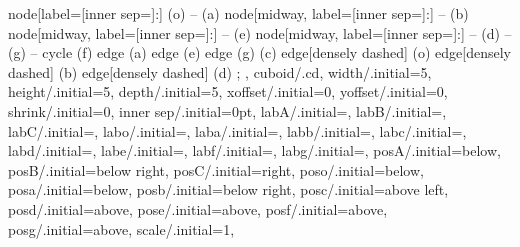 {{{        node[label={[inner sep=]:}] {}
         (o) 
         -- (a) 
         node[midway, label={[inner sep=]:}] {}
         -- (b)
         node[midway, label={[inner sep=]:}] {}
         -- (e)
         node[midway, label={[inner sep=]:}] {}
         -- (d)
         -- (g)
         -- cycle
         (f)
         edge (a)
         edge (e)
         edge (g)
         (c) 
         edge[densely dashed] (o) 
         edge[densely dashed] (b) 
         edge[densely dashed] (d)
    ;
  }},
  cuboid/.cd,
  width/.initial=5,
  height/.initial=5,
  depth/.initial=5,
  xoffset/.initial=0,
  yoffset/.initial=0,
  shrink/.initial=0,
  inner sep/.initial=0pt,
  labA/.initial=,
  labB/.initial=,
  labC/.initial=,
  labo/.initial=,
  laba/.initial=,
  labb/.initial=,
  labc/.initial=,
  labd/.initial=,
  labe/.initial=,
  labf/.initial=,
  labg/.initial=,
  posA/.initial=below,
  posB/.initial=below right,
  posC/.initial=right,
  poso/.initial=below,
  posa/.initial=below,
  posb/.initial=below right,
  posc/.initial=above left,
  posd/.initial=above,
  pose/.initial=above,
  posf/.initial=above,
  posg/.initial=above,
  scale/.initial=1,
}


